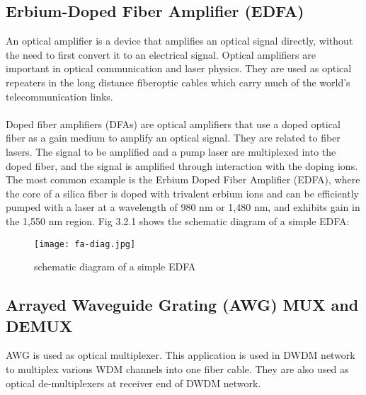 \documentclass[hidelinks, 12pt]{report}
\begin{document}
\subsection{Erbium-Doped
Fiber Amplifier (EDFA)}
An optical amplifier is a device that amplifies an optical signal directly, without the need to first convert it to an electrical signal. Optical amplifiers are important in optical communication and laser physics. They are used as optical repeaters in the long distance fiberoptic cables which carry much of the world's telecommunication links. \\
\\Doped fiber amplifiers (DFAs) are optical amplifiers that use a doped optical fiber as a gain medium to amplify an optical signal. They are related to fiber lasers. The signal to be amplified and a pump laser are multiplexed into the doped fiber, and the signal is amplified through interaction with the doping ions.
\\The most common example is the Erbium Doped Fiber Amplifier (EDFA), where the core of a silica fiber is doped with trivalent erbium ions and can be efficiently pumped with a laser at a wavelength of 980 nm or 1,480 nm, and exhibits gain in the 1,550 nm region.
Fig 3.2.1 shows the schematic diagram of a simple EDFA:

\begin{figure}[H]
\centering
\texttt{[image: fa-diag.jpg]}
\caption[schematic diagram of a simple EDFA]{schematic diagram of a simple EDFA}
\label{schematic diagram of a simple EDFA}
\end{figure}


\subsection{Arrayed Waveguide Grating (AWG) MUX and DEMUX}
\justify
AWG is used as optical multiplexer. This application is used in DWDM network to multiplex various WDM channels into one fiber cable.
They are also used as optical de-multiplexers at receiver end of DWDM network.
\end{document}
